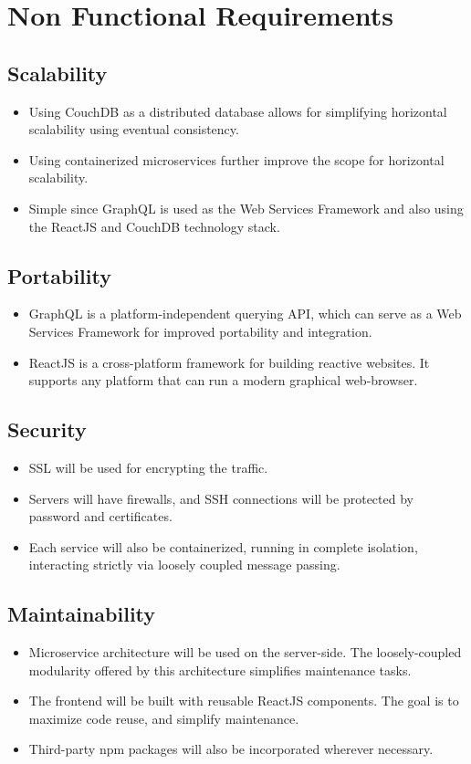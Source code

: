 \section{Non Functional Requirements}

\subsection{Scalability}
\begin{itemize}
    \item Using CouchDB as a distributed database allows for simplifying 
    horizontal scalability using eventual consistency.
    \item Using containerized microservices further improve the scope for horizontal scalability.
    \item Simple since GraphQL is used as the Web Services Framework 
    and also using the ReactJS and CouchDB technology stack.
\end{itemize}

\subsection{Portability}
\begin{itemize}
    \item GraphQL is a platform-independent querying API, 
    which can serve as a Web Services Framework for improved portability and integration.
    \item ReactJS is a cross-platform framework for building reactive websites. 
    It supports any platform that can run a modern graphical web-browser.
\end{itemize}

\subsection{Security}
\begin{itemize}
    \item SSL will be used for encrypting the traffic.
    \item Servers will have firewalls, and SSH connections will be protected by password and certificates.
    \item Each service will also be containerized, running in complete isolation, interacting strictly via 
    loosely coupled message passing.
\end{itemize}

\subsection{Maintainability}
\begin{itemize}
    \item Microservice architecture will be used on the server-side. 
    The loosely-coupled modularity offered by this architecture simplifies maintenance tasks.
    \item The frontend will be built with reusable ReactJS components. 
    The goal is to maximize code reuse, and simplify maintenance.
    \item Third-party npm packages will also be incorporated wherever necessary.
\end{itemize}


